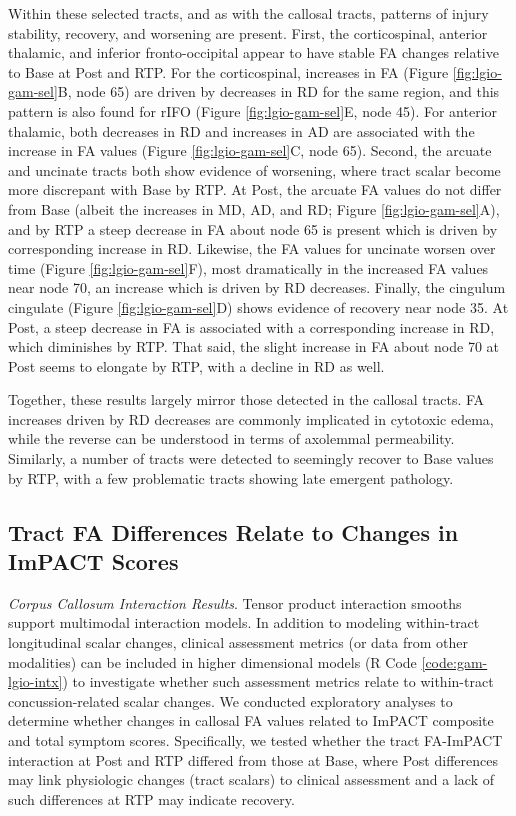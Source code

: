 \documentclass[12pt]{article}
\begin{document}
Within these selected tracts, and as with the callosal tracts, patterns of injury stability, recovery, and worsening are present. First, the corticospinal, anterior thalamic, and inferior fronto-occipital appear to have stable FA changes relative to Base at Post and RTP. For the corticospinal, increases in FA (Figure \ref{fig:lgio-gam-sel}B, node 65) are driven by decreases in RD for the same region, and this pattern is also found for rIFO (Figure \ref{fig:lgio-gam-sel}E, node 45). For anterior thalamic, both decreases in RD and increases in AD are associated with the increase in FA values (Figure \ref{fig:lgio-gam-sel}C, node 65). Second, the arcuate and uncinate tracts both show evidence of worsening, where tract scalar become more discrepant with Base by RTP. At Post, the arcuate FA values do not differ from Base (albeit the increases in MD, AD, and RD; Figure \ref{fig:lgio-gam-sel}A), and by RTP a steep decrease in FA about node 65 is present which is driven by corresponding increase in RD. Likewise, the FA values for uncinate worsen over time (Figure \ref{fig:lgio-gam-sel}F), most dramatically in the increased FA values near node 70, an increase which is driven by RD decreases. Finally, the cingulum cingulate (Figure \ref{fig:lgio-gam-sel}D) shows evidence of recovery near node 35. At Post, a steep decrease in FA is associated with a corresponding increase in RD, which diminishes by RTP. That said, the slight increase in FA about node 70 at Post seems to elongate by RTP, with a decline in RD as well.

Together, these results largely mirror those detected in the callosal tracts. FA increases driven by RD decreases are commonly implicated in cytotoxic edema, while the reverse can be understood in terms of axolemmal permeability. Similarly, a number of tracts were detected to seemingly recover to Base values by RTP, with a few problematic tracts showing late emergent pathology.


\subsection{Tract FA Differences Relate to Changes in ImPACT Scores}
\label{ssec:res-dwi-imp}
\textit{Corpus Callosum Interaction Results}. Tensor product interaction smooths support multimodal interaction models. In addition to modeling within-tract longitudinal scalar changes, clinical assessment metrics (or data from other modalities) can be included in higher dimensional models (R Code \ref{code:gam-lgio-intx}) to investigate whether such assessment metrics relate to within-tract concussion-related scalar changes. We conducted exploratory analyses to determine whether changes in callosal FA values related to ImPACT composite and total symptom scores. Specifically, we tested whether the tract FA-ImPACT interaction at Post and RTP differed from those at Base, where Post differences may link physiologic changes (tract scalars) to clinical assessment and a lack of such differences at RTP may indicate recovery.
\end{document}
